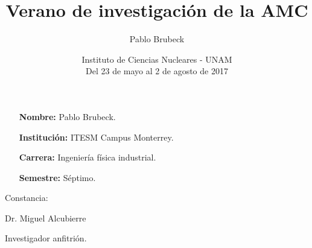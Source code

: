 \documentclass[12pt]{article}
\title{Verano de investigación de la AMC}
\author{Pablo Brubeck}
\date{Instituto de Ciencias Nucleares - UNAM\\Del 23 de mayo al 2 de agosto de 2017}
\begin{document}
\maketitle

\bigskip
\bigskip

\begin{itemize}
	\item[\textbf{Nombre:}] Pablo Brubeck.
	
	\item[\textbf{Institución:}] ITESM Campus Monterrey.
	
	\item[\textbf{Carrera:}] Ingeniería física industrial.
	
	\item[\textbf{Semestre:}] Séptimo.
\end{itemize}

\bigskip
\bigskip
\bigskip
\bigskip

Constancia: \hrulefill

\hspace*{0mm}\phantom{Constancia: }Dr. Miguel Alcubierre

\hspace*{0mm}\phantom{Constancia: }Investigador anfitrión.
\end{document}
